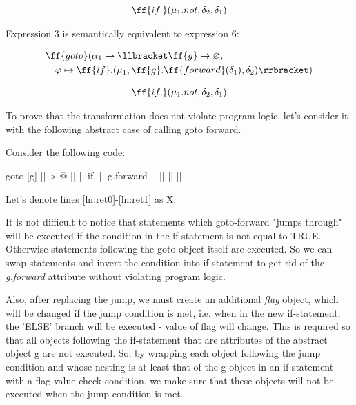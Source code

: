 \documentclass[sigplan,review,11pt,nonacm,natbib=false]{acmart}
\begin{document}
\begin{equation}
\begin{split}
& \ff{if.}(\mu_1.not, \delta_2, \delta_1) \\
\end{split}
\end{equation}

\begin{theorem}
Expression 3 is semantically equivalent to expression 6:
\end{theorem}

\begin{equation} \nonumber
\begin{split}
& \ff{goto} ( \alpha_1 \mapsto \llbracket \ff{g} \mapsto \varnothing, \\
& \quad \varphi \mapsto \ff{if}.(\mu_1, \ff{g}.\ff{forward}(\delta_1), \delta_2) \rrbracket) \\
\end{split}
\end{equation}

\hline

\begin{equation} \nonumber
\begin{split}
& \ff{if.}(\mu_1.not, \delta_2, \delta_1) \\
\end{split}
\end{equation}

To prove that the transformation does not violate program logic, let's consider it with the following abstract case of calling goto forward.

Consider the following code:

\begin{ffcode}
goto
  [g]
    || > @ |$\label{ln:ret0}$|
      ||
      if.
        ||
        g.forward ||
        ||
      || |$\label{ln:ret1}$|
\end{ffcode}

Let's denote lines \ref{ln:ret0}-\ref{ln:ret1} as X.

It is not difficult to notice that statements which goto-forward "jumps through" will be executed if the condition in the if-statement is not equal to TRUE.
Otherwise statements following the goto-object itself are executed.
So we can swap statements and invert the condition into if-statement to get rid of the \emph{g.forward} attribute without violating program logic.

Also, after replacing the jump, we must create an additional \emph{flag} object, which will be changed if the jump condition is met, i.e. when in the new if-statement, the 'ELSE' branch will be executed - value of flag will change. This is required so that all objects following the if-statement that are attributes of the abstract object g are not executed.
So, by wrapping each object following the jump condition and whose nesting is at least that of the g object in an if-statement with a flag value check condition, we make sure that these objects will not be executed when the jump condition is met.
\end{document}
